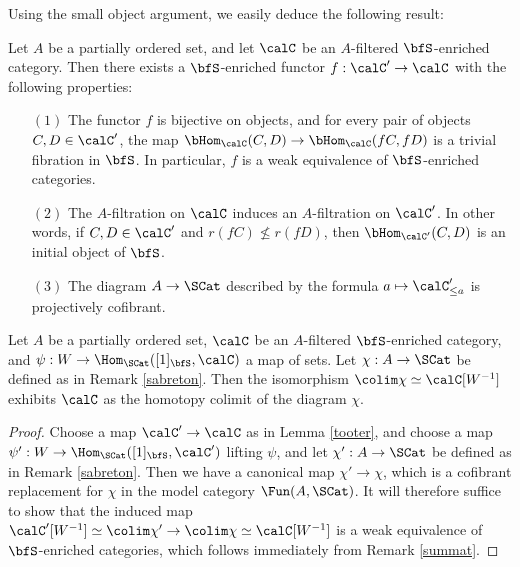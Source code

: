 Using the small object argument, we easily deduce the following result:

\begin{lemma}\label{tooter}
Let $A$ be a partially ordered set, and let $\calC$ be an $A$-filtered
$\bfS$-enriched category. Then there exists a $\bfS$-enriched functor
$f: \calC' \rightarrow \calC$ with the following properties:
\begin{itemize}
\item[$(1)$] The functor $f$ is bijective on objects, and for every
pair of objects $C,D \in \calC'$, the map $\bHom_{\calC}(C,D)
\rightarrow \bHom_{\calC}(fC, fD)$ is a trivial fibration in $\bfS$. In particular,
$f$ is a weak equivalence of $\bfS$-enriched categories.

\item[$(2)$] The $A$-filtration on $\calC$ induces an $A$-filtration on $\calC'$. In other
words, if $C, D \in \calC'$ and $r(fC) \nleq r(fD)$, then $\bHom_{\calC'}(C,D)$ is
an initial object of $\bfS$.

\item[$(3)$] The diagram $A \rightarrow \SCat$ described by the formula
$a \mapsto \calC'_{\leq a}$ is projectively cofibrant.
\end{itemize}
\end{lemma}

\begin{proposition}\label{scun}
Let $A$ be a partially ordered set, $\calC$ be an $A$-filtered
$\bfS$-enriched category, and $\psi: W \rightarrow \Hom_{ \SCat}( [1]_{\bfS}, \calC)$
a map of sets. Let $\chi: A \rightarrow \SCat$ be defined as in Remark \ref{sabreton}. Then the
isomorphism $\colim \chi \simeq \calC[W^{-1}]$ exhibits $\calC$ as the homotopy colimit
of the diagram $\chi$.
\end{proposition}

\begin{proof}
Choose a map $\calC' \rightarrow \calC$ as in Lemma \ref{tooter}, and
choose a map $\psi': W \rightarrow \Hom_{\SCat}( [1]_{\bfS}, \calC' )$ lifting
$\psi$, and let $\chi': A \rightarrow \SCat$ be defined as in Remark \ref{sabreton}.
Then we have a canonical map $\chi' \rightarrow \chi$, which is a cofibrant
replacement for $\chi$ in the model category $\Fun( A, \SCat)$. It will therefore suffice to show that the induced map
$\calC'[W^{-1}] \simeq \colim \chi' \rightarrow \colim \chi \simeq \calC[W^{-1}]$ is a weak equivalence of
$\bfS$-enriched categories, which follows immediately from Remark \ref{summat}.
\end{proof}

